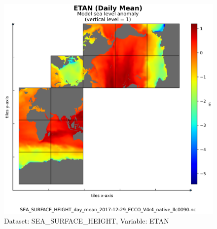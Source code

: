 \begin{figure}[H]
\centering
\includegraphics[scale=0.55]{../images/plots/native_plots/Sea_Surface_Height/ETAN.png}
\caption{Dataset: SEA\_SURFACE\_HEIGHT, Variable: ETAN}
\label{tab:table-SEA_SURFACE_HEIGHT_ETAN-Plot}
\end{figure}
\newpage
\pagebreak
